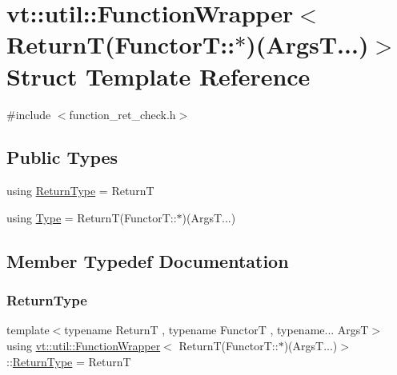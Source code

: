 \hypertarget{structvt_1_1util_1_1_function_wrapper_3_01_return_t_07_functor_t_1_1_5_08_07_args_t_8_8_8_08_4}{}\section{vt\+:\+:util\+:\+:Function\+Wrapper$<$ ReturnT(FunctorT\+:\+:$\ast$)(ArgsT...)$>$ Struct Template Reference}
\label{structvt_1_1util_1_1_function_wrapper_3_01_return_t_07_functor_t_1_1_5_08_07_args_t_8_8_8_08_4}


{\ttfamily \#include $<$function\+\_\+ret\+\_\+check.\+h$>$}

\subsection*{Public Types}
\begin{DoxyCompactItemize}
\item 
using \hyperlink{structvt_1_1util_1_1_function_wrapper_3_01_return_t_07_functor_t_1_1_5_08_07_args_t_8_8_8_08_4_a38ec972af9c0f8475073b8d06d3c0792}{Return\+Type} = ReturnT
\item 
using \hyperlink{structvt_1_1util_1_1_function_wrapper_3_01_return_t_07_functor_t_1_1_5_08_07_args_t_8_8_8_08_4_a5c150c8595cfe179fe3edc7ceca7d354}{Type} = ReturnT(Functor\+T\+::$\ast$)(Args\+T...)
\end{DoxyCompactItemize}


\subsection{Member Typedef Documentation}
\mbox{\label{structvt_1_1util_1_1_function_wrapper_3_01_return_t_07_functor_t_1_1_5_08_07_args_t_8_8_8_08_4_a38ec972af9c0f8475073b8d06d3c0792}} 
\subsubsection{\texorpdfstring{Return\+Type}{ReturnType}}
{\footnotesize\ttfamily template$<$typename ReturnT , typename FunctorT , typename... ArgsT$>$ \\
using \hyperlink{structvt_1_1util_1_1_function_wrapper}{vt\+::util\+::\+Function\+Wrapper}$<$ ReturnT(Functor\+T\+::$\ast$)(Args\+T...)$>$\+::\hyperlink{structvt_1_1util_1_1_function_wrapper_3_01_return_t_07_functor_t_1_1_5_08_07_args_t_8_8_8_08_4_a38ec972af9c0f8475073b8d06d3c0792}{Return\+Type} =  ReturnT}

